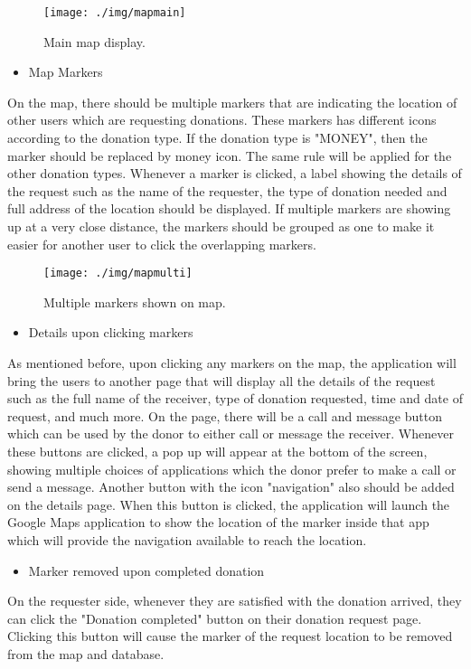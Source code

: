 \documentclass[conference]{IEEEtran}
\begin{document}
\begin{figure}[h!]
\texttt{[image: ./img/mapmain]}
\centering
\caption{Main map display.}
\end{figure}
\begin{itemize}
\item Map Markers
\end{itemize}
\par On the map, there should be multiple markers that are indicating the location of other users which are requesting donations. These markers has different icons according to the donation type. If the donation type is "MONEY", then the marker should be replaced by money icon. The same rule will be applied for the other donation types. Whenever a marker is clicked, a label showing the details of the request such as the name of the requester, the type of donation needed and full address of the location should be displayed. If multiple markers are showing up at a very close distance, the markers should be grouped as one to make it easier for another user to click the overlapping markers. 

\begin{figure}[h!]
\texttt{[image: ./img/mapmulti]}
\centering
\caption{Multiple markers shown on map.}
\end{figure}
\begin{itemize}
\item Details upon clicking markers
\end{itemize}
\par As mentioned before, upon clicking any markers on the map, the application will bring the users to another page that will display all the details of the request such as the full name of the receiver, type of donation requested, time and date of request, and much more. On the page, there will be a call and message button which can be used by the donor to either call or message the receiver. Whenever these buttons are clicked, a pop up will appear at the bottom of the screen, showing multiple choices of applications which the donor prefer to make a call or send a message. Another button with the icon "navigation" also should be added on the details page. When this button is clicked, the application will launch the Google Maps application to show the location of the marker inside that app which will provide the navigation available to reach the location.\\

\begin{itemize}
\item Marker removed upon completed donation
\end{itemize}
\par On the requester side, whenever they are satisfied with the donation arrived, they can click the "Donation completed" button on their donation request page. Clicking this button will cause the marker of the request location to be removed from the map and database.\\
\end{document}
